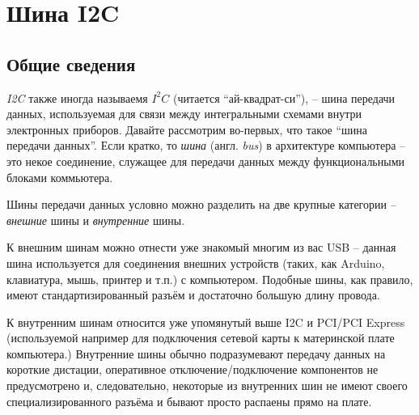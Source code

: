 \documentclass[../sparc.tex]{subfiles}
\begin{document}
\section{Шина I2C}
\label{section:i2c}




\subsection{Общие сведения}

\textit{\gls{I2C}} также иногда называемя $I^{2}C$ (читается ``ай-квадрат-си''),
-- шина передачи данных, используемая для связи между интегральными схемами
внутри электронных приборов. Давайте рассмотрим во-первых, что такое ``шина
передачи данных''. Если кратко, то \textit{шина} (англ. \textit{bus}) в
архитектуре компьютера -- это некое соединение, служащее для передачи данных
между функциональными блоками коммьютера.

Шины передачи данных условно можно разделить на две крупные категории --
\textit{внешние} шины и \textit{внутренние} шины.

К внешним шинам можно отнести уже знакомый многим из вас \gls{USB} -- данная шина
используется для соединения внешних устройств (таких, как Arduino, клавиатура,
мышь, принтер и т.п.) с компьютером.  Подобные шины, как правило, имеют
стандартизированный разъём и достаточно большую длину провода.

К внутренним шинам относится уже упомянутый выше \gls{I2C} и \gls{PCI}/PCI
Express (используемой например для подключения сетевой карты к материнской плате
компьютера.)  Внутренние шины обычно подразумевают передачу данных на короткие
дистации, оперативное отключение/подключение компонентов не предусмотрено и,
следовательно, некоторые из внутренних шин не имеют своего специализированного
разъёма и бывают просто распаены прямо на плате.
\end{document}
